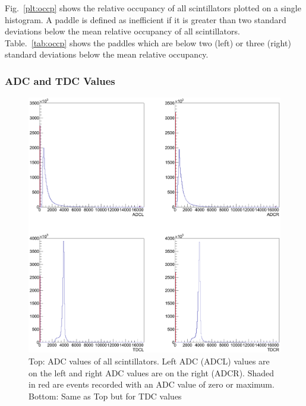 Fig.~\ref{plt:occp} shows the relative occupancy of all scintillators plotted on a single histogram. A paddle is defined as inefficient if it is greater than two standard deviations below the mean relative occupancy of all scintillators. Table.~\ref{tab:occp} shows the paddles which are below two (left) or three (right) standard deviations below the mean relative occupancy.


\subsubsection{ADC and TDC Values}

\begin{figure}\begin{center}
    \includegraphics[width=0.70\linewidth]{figures/calib/tof/tofko/adctdcval.eps}
    \caption{\label{plt:adctdcval}Top: ADC values of all scintillators. Left ADC (ADCL) values are on the left and right ADC values are on the right (ADCR). Shaded in red are events recorded with an ADC value of zero or maximum. Bottom: Same as Top but for TDC values}
\end{center}\end{figure}

